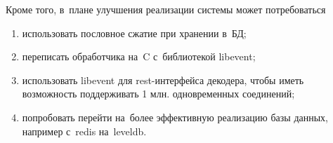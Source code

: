 Кроме того, в~плане улучшения реализации системы может потребоваться
{\renewcommand{\labelenumi}{\alph{enumi})}
	\begin{enumerate}
		\item использовать пословное сжатие при хранении в~БД;
		\item переписать обработчика на~C с~библиотекой libevent;
		\item использовать libevent для rest-интерфейса декодера,
			чтобы иметь возможность поддерживать 1 млн. одновременных соединений;
		\item попробовать перейти на~более эффективную реализацию базы данных, 
			например с~redis на~leveldb.
	\end{enumerate}
}


\pagebreak




